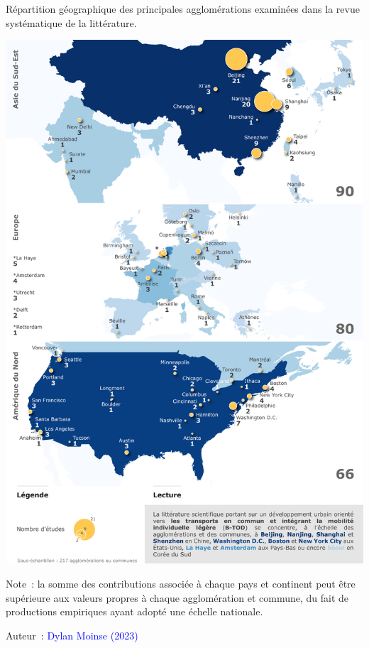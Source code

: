 \begin{refsegment}
    \begin{carte}[h!]\vspace*{4pt}
        \caption{Répartition géographique des principales agglomérations examinées dans la revue systématique de la littérature.}
        \label{fig-chap2:terrains-geographiques-villes}
        \centerline{\includegraphics[width=1\columnwidth]{src/Figures/Chap-2/FR_RSL_Carte_Villes.pdf}}
        \vspace{5pt}
        \begin{flushleft}\scriptsize{
        Note~: la somme des contributions associée à chaque pays et continent peut être supérieure aux valeurs propres à chaque agglomération et commune, du fait de productions empiriques ayant adopté une échelle nationale.
        }\end{flushleft}
        \begin{flushright}\scriptsize{
        Auteur~: \textcolor{blue}{Dylan Moinse (2023)}
        }\end{flushright}
    \end{carte}


\end{refsegment}
